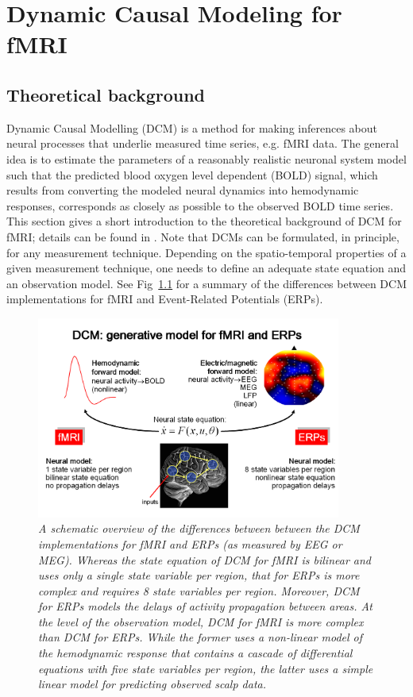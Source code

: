 \chapter{Dynamic Causal Modeling for fMRI \label{Chap:DCM_fmri}}


\section{Theoretical background}
Dynamic Causal Modelling (DCM) is a method for making inferences about neural processes that underlie measured time series, e.g. fMRI data.  The general idea is to estimate the parameters of a reasonably realistic neuronal system model such that the predicted blood oxygen level dependent (BOLD) signal, which results from converting the modeled neural dynamics into hemodynamic responses, corresponds as closely as possible to the observed BOLD time series.  This section gives a short introduction to the theoretical background of DCM for fMRI; details can be found in \cite{dcm}.  Note that DCMs can be formulated, in principle, for any measurement technique.  Depending on the spatio-temporal properties of a given measurement technique, one needs to define an adequate state equation and an observation model. See Fig~\ref{dcm_fig1} for a summary of the differences between DCM implementations for fMRI and Event-Related Potentials (ERPs).

\begin{figure}[ht]
\begin{center}
\includegraphics[width=100mm]{dcm/Fig1}
\caption{\em A schematic overview of the differences between between the DCM implementations for fMRI and ERPs (as measured by EEG or MEG).  Whereas the state equation of DCM for fMRI is bilinear and uses only a single state variable per region, that for ERPs is more complex and requires 8 state variables per region.  Moreover, DCM for ERPs models the delays of activity propagation between areas.  At the level of the observation model, DCM for fMRI is more complex than DCM for ERPs.  While the former uses a non-linear model of the hemodynamic response that contains a cascade of differential equations with five state variables per region, the latter uses a simple linear model for predicting observed scalp data.\label{dcm_fig1}}
\end{center}
\end{figure}

